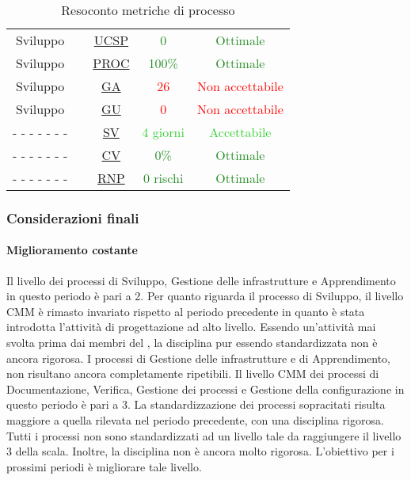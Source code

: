 \begin{table}[H]
{\begin{tabular}{c | c | c | c | c}
Sviluppo            & \nameref{R2ASP}    & \hyperref[MMC]{UCSP}   & \textcolor{ForestGreen}{0}          & \textcolor{ForestGreen}{Ottimale} \\
Sviluppo            & \nameref{R2CRO}    & \hyperref[MMC]{PROC}   & \textcolor{ForestGreen}{100\%}          & \textcolor{ForestGreen}{Ottimale} \\
Sviluppo            & \nameref{R2BGDA}    & \hyperref[MMC]{GA}   & \textcolor{Red}{26}          & \textcolor{Red}{Non accettabile} \\
Sviluppo            & \nameref{R2AGDU}    & \hyperref[MMC]{GU}   & \textcolor{Red}{0}          & \textcolor{Red}{Non accettabile} \\



- - - - - - -         & \nameref{R2RDP}   & \hyperref[MRDP]{SV}    & \textcolor{LimeGreen}{4 giorni}   & \textcolor{LimeGreen}{Accettabile} \\
- - - - - - -         & \nameref{R2RDB}   & \hyperref[MRDB]{CV}    & \textcolor{ForestGreen}{0\%}      & \textcolor{ForestGreen}{Ottimale}  \\
- - - - - - -         & \nameref{R2CDADR} & \hyperref[MCDADR]{RNP} & \textcolor{ForestGreen}{0 rischi} & \textcolor{ForestGreen}{Ottimale}  \\ \hline
\end{tabular}}
\caption{Resoconto metriche di processo}
\label{tab:resoconto_metriche_processo}
\end{table}

\subsubsection{Considerazioni finali}
\paragraph{Miglioramento costante}
\label{R2MC}
Il livello  dei processi di Sviluppo, Gestione delle infrastrutture e Apprendimento in questo periodo è pari a 2.
Per quanto riguarda il processo di Sviluppo, il livello CMM è rimasto invariato rispetto al periodo precedente in quanto è stata introdotta l'attività di progettazione ad alto livello. Essendo un'attività mai svolta prima dai membri del , la disciplina pur essendo standardizzata non è ancora rigorosa.
I processi di Gestione delle infrastrutture e di Apprendimento, non risultano ancora completamente ripetibili.
Il livello CMM dei processi di Documentazione, Verifica, Gestione dei processi e Gestione della configurazione in questo periodo è pari a 3.
La standardizzazione dei processi sopracitati risulta maggiore a quella rilevata nel periodo precedente, con una disciplina rigorosa.
Tutti i processi non sono standardizzati ad un livello tale da raggiungere il livello 3 della scala. Inoltre, la disciplina non è ancora molto rigorosa. L'obiettivo per i prossimi periodi è migliorare tale livello.

